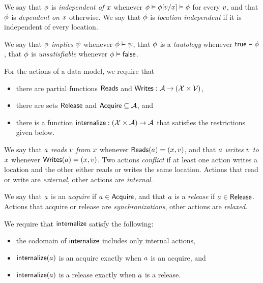 We say that $\phi$ is \emph{independent of $x$} whenever
$\phi \vDash \phi[v/x] \vDash \phi$ for every $v$, and that
$\phi$ is \emph{dependent on $x$} otherwise.  We say that $\phi$ is
\emph{location independent} if it is independent of every location.

We say that $\phi$ \emph{implies} $\psi$ whenever $\phi\vDash\psi$,
that $\phi$ is a \emph{tautology} whenever $\mathsf{true}\vDash\phi$, that
$\phi$ is \emph{unsatisfiable} whenever $\phi\vDash\mathsf{false}$.

For the actions of a data model, we require that
\begin{itemize}
\item there are partial functions $\mathsf{Reads}$ and
  $\mathsf{Writes}: \mathcal{A} \mathbin\rightarrow (\mathcal{X} \times \mathcal{V})$,
\item there are sets $\mathsf{Release}$ and $\mathsf{Acquire} \subseteq\mathcal{A}$, and
\item there is a function $\mathsf{internalize}: (\mathcal{X}\times\mathcal{A}) \mathbin\rightarrow \mathcal{A}$ that
  satisfies the restrictions given below.
\end{itemize}

We say that $a$ \emph{reads} $v$ \emph{from} $x$ whenever
$\mathsf{Reads}(a) = (x,v)$, and that $a$ \emph{writes} $v$
\emph{to} $x$ whenever $\mathsf{Writes}(a) = (x,v)$.  Two actions
\emph{conflict} if at least one action writes a location and the other either
reads or writes the same location.  Actions that read or write are
\emph{external}, other actions are \emph{internal}.

We say that $a$ is an \emph{acquire} if $a\in\mathsf{Acquire}$, and that $a$
is a \emph{release} if $a\in\mathsf{Release}$.  Actions that acquire or release are
\emph{synchronizations}, other actions are \emph{relaxed}.

We require that $\mathsf{internalize}$ satisfy the following:
\begin{itemize}
\item the codomain of $\mathsf{internalize}$ includes only internal actions, %
\item $\mathsf{internalize}(a)$ is an acquire exactly when $a$ is an acquire, and 
\item $\mathsf{internalize}(a)$ is a release exactly when $a$ is a release.
\end{itemize}

